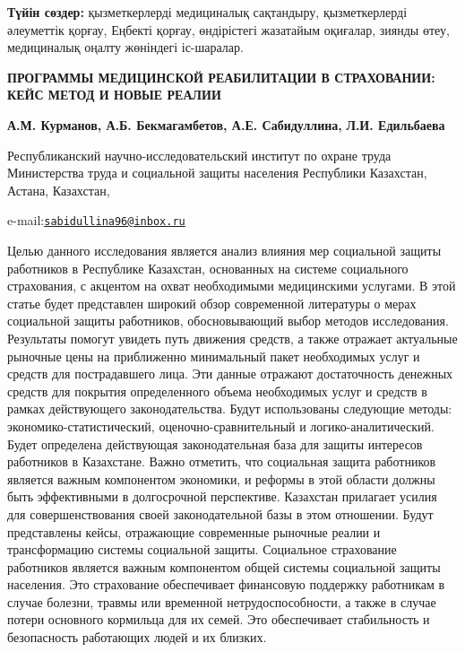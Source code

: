 {\bfseries Түйін сөздер:} қызметкерлерді медициналық сақтандыру,
қызметкерлерді әлеуметтік қорғау, Еңбекті қорғау, өндірістегі жазатайым
оқиғалар, зиянды өтеу, медициналық оңалту жөніндегі іс-шаралар.
\begin{articleheader}

{\bfseries ПРОГРАММЫ МЕДИЦИНСКОЙ РЕАБИЛИТАЦИИ В СТРАХОВАНИИ: КЕЙС МЕТОД И НОВЫЕ РЕАЛИИ}

{\bfseries А.М. Курманов, А.Б. Бекмагамбетов, А.Е.
Сабидуллина\textsuperscript{\envelope },} {\bfseries Л.И. Едильбаева}

\end{articleheader}
\begin{affiliation}

Республиканский научно-исследовательский институт по охране труда
Министерства труда и социальной защиты населения Республики Казахстан,
Астана, Казахстан,

e-mail:\href{mailto:sabidullina96@inbox.ru}{\nolinkurl{sabidullina96@inbox.ru}}
\end{affiliation}

Целью данного исследования является анализ влияния мер социальной защиты
работников в Республике Казахстан, основанных на системе социального
страхования, с акцентом на охват необходимыми медицинскими услугами. В
этой статье будет представлен широкий обзор современной литературы о
мерах социальной защиты работников, обосновывающий выбор методов
исследования. Результаты помогут увидеть путь движения средств, а также
отражает актуальные рыночные цены на приближенно минимальный пакет
необходимых услуг и средств для пострадавшего лица. Эти данные отражают
достаточность денежных средств для покрытия определенного объема
необходимых услуг и средств в рамках действующего законодательства.
Будут использованы следующие методы: экономико-статистический,
оценочно-сравнительный и логико-аналитический. Будет определена
действующая законодательная база для защиты интересов работников в
Казахстане. Важно отметить, что социальная защита работников является
важным компонентом экономики, и реформы в этой области должны быть
эффективными в долгосрочной перспективе. Казахстан прилагает усилия для
совершенствования своей законодательной базы в этом отношении. Будут
представлены кейсы, отражающие современные рыночные реалии и
трансформацию системы социальной защиты. Социальное страхование
работников является важным компонентом общей системы социальной защиты
населения. Это страхование обеспечивает финансовую поддержку работникам
в случае болезни, травмы или временной нетрудоспособности, а также в
случае потери основного кормильца для их семей. Это обеспечивает
стабильность и безопасность работающих людей и их близких.

